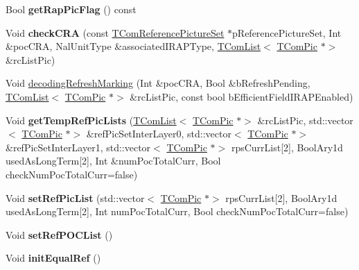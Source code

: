 \begin{DoxyCompactItemize}
Bool {\bfseries get\+Rap\+Pic\+Flag} () const
\item 
\mbox{\label{class_t_com_slice_a89ed5bb2fed18eae436c03267d728a6e}} 
Void {\bfseries check\+C\+RA} (const \hyperlink{class_t_com_reference_picture_set}{T\+Com\+Reference\+Picture\+Set} $\ast$p\+Reference\+Picture\+Set, Int \&poc\+C\+RA, Nal\+Unit\+Type \&associated\+I\+R\+A\+P\+Type, \hyperlink{class_t_com_list}{T\+Com\+List}$<$ \hyperlink{class_t_com_pic}{T\+Com\+Pic} $\ast$$>$ \&rc\+List\+Pic)
\item 
Void \hyperlink{class_t_com_slice_aa4a3c623876f4f967def7faf17ad8453}{decoding\+Refresh\+Marking} (Int \&poc\+C\+RA, Bool \&b\+Refresh\+Pending, \hyperlink{class_t_com_list}{T\+Com\+List}$<$ \hyperlink{class_t_com_pic}{T\+Com\+Pic} $\ast$$>$ \&rc\+List\+Pic, const bool b\+Efficient\+Field\+I\+R\+A\+P\+Enabled)
\item 
\mbox{\label{class_t_com_slice_a07a2698266adc8132e9fbb754f463303}} 
Void {\bfseries get\+Temp\+Ref\+Pic\+Lists} (\hyperlink{class_t_com_list}{T\+Com\+List}$<$ \hyperlink{class_t_com_pic}{T\+Com\+Pic} $\ast$$>$ \&rc\+List\+Pic, std\+::vector$<$ \hyperlink{class_t_com_pic}{T\+Com\+Pic} $\ast$$>$ \&ref\+Pic\+Set\+Inter\+Layer0, std\+::vector$<$ \hyperlink{class_t_com_pic}{T\+Com\+Pic} $\ast$$>$ \&ref\+Pic\+Set\+Inter\+Layer1, std\+::vector$<$ \hyperlink{class_t_com_pic}{T\+Com\+Pic} $\ast$$>$ rps\+Curr\+List\mbox{[}2\mbox{]}, Bool\+Ary1d used\+As\+Long\+Term\mbox{[}2\mbox{]}, Int \&num\+Poc\+Total\+Curr, Bool check\+Num\+Poc\+Total\+Curr=false)
\item 
\mbox{\label{class_t_com_slice_a16b9876c995f9ea62d6870de471f650a}} 
Void {\bfseries set\+Ref\+Pic\+List} (std\+::vector$<$ \hyperlink{class_t_com_pic}{T\+Com\+Pic} $\ast$$>$ rps\+Curr\+List\mbox{[}2\mbox{]}, Bool\+Ary1d used\+As\+Long\+Term\mbox{[}2\mbox{]}, Int num\+Poc\+Total\+Curr, Bool check\+Num\+Poc\+Total\+Curr=false)
\item 
\mbox{\label{class_t_com_slice_a38a7efb91cabc9b3a968088363bc94a5}} 
Void {\bfseries set\+Ref\+P\+O\+C\+List} ()
\item 
\mbox{\label{class_t_com_slice_a319fe101d0dd9f253e771f3a1e962a72}} 
Void {\bfseries init\+Equal\+Ref} ()
\item 
$$
\end{DoxyCompactItemize}
